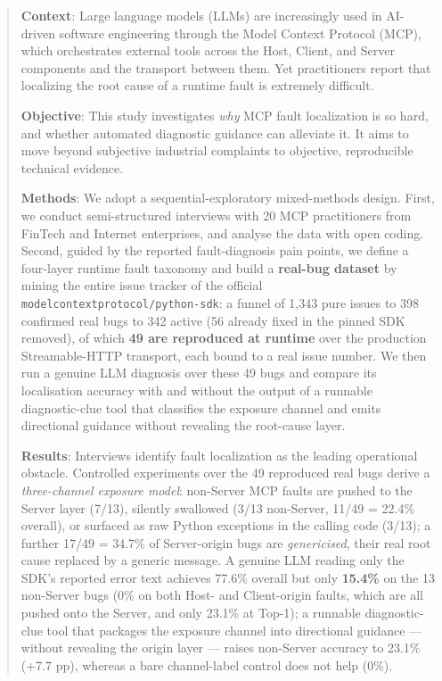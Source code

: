\documentclass[a4paper,fleqn]{cas-dc}
\begin{document}
\begin{abstract}
\noindent \textbf{Context}: Large language models (LLMs) are increasingly used in AI-driven
software engineering through the Model Context Protocol (MCP), which orchestrates external
tools across the Host, Client, and Server components and the transport between them. Yet
practitioners report that localizing the root cause of a runtime fault is extremely difficult.

\noindent \textbf{Objective}: This study investigates \emph{why} MCP fault localization is so
hard, and whether automated diagnostic guidance can alleviate it. It aims to move beyond
subjective industrial complaints to objective, reproducible technical evidence.

\noindent \textbf{Methods}: We adopt a sequential-exploratory mixed-methods design. First, we
conduct semi-structured interviews with 20 MCP practitioners from FinTech and Internet
enterprises, and analyse the data with open coding. Second, guided by the reported
fault-diagnosis pain points, we define a four-layer runtime fault taxonomy and build a
\textbf{real-bug dataset} by mining the entire issue tracker of the official
\verb|modelcontextprotocol/python-sdk|: a funnel of 1,343 pure issues to 398
confirmed real bugs to 342 active (56 already fixed in the
pinned SDK removed), of which \textbf{49 are reproduced at runtime} over the production
Streamable-HTTP transport, each bound to a real issue number. We then run a genuine LLM
diagnosis over these 49 bugs and compare its localisation accuracy with and without the output
of a runnable diagnostic-clue tool that classifies the exposure channel and emits directional
guidance without revealing the root-cause layer.

\noindent \textbf{Results}: Interviews identify fault localization as the leading operational
obstacle. Controlled experiments over the 49 reproduced real bugs derive a \emph{three-channel
exposure model}: non-Server MCP faults are pushed to the Server layer (7/13), silently
swallowed (3/13 non-Server, 11/49 = 22.4\% overall), or surfaced as raw Python exceptions in
the calling code (3/13); a further 17/49 = 34.7\% of Server-origin bugs are \emph{genericised},
their real root cause replaced by a generic message. A genuine LLM reading only the SDK's
reported error text achieves 77.6\% overall but only \textbf{15.4\%} on the 13 non-Server bugs
(0\% on both Host- and Client-origin faults, which are all pushed onto the Server, and only
23.1\% at Top-1); a runnable diagnostic-clue tool that packages the exposure channel into
directional guidance --- without revealing the origin layer --- raises non-Server accuracy to
23.1\% (+7.7 pp), whereas a bare channel-label control does not help (0\%).


\end{abstract}
\end{document}
